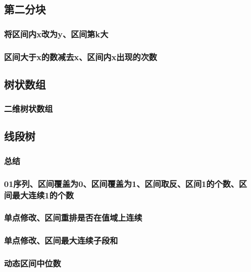 \documentclass[10pt,a4paper]{article}
\begin{document}
\subsection{第二分块}
\subsubsection{将区间内x改为y、区间第k大}

\subsubsection{区间大于x的数减去x、区间内x出现的次数}

\subsection{树状数组}
\subsubsection{二维树状数组}

\subsection{线段树}
\subsubsection{总结}

\subsubsection{01序列、区间覆盖为0、区间覆盖为1、区间取反、区间1的个数、区间最大连续1的个数}

\subsubsection{单点修改、区间重排是否在值域上连续}

\subsubsection{单点修改、区间最大连续子段和}

\subsubsection{动态区间中位数}

\end{document}
